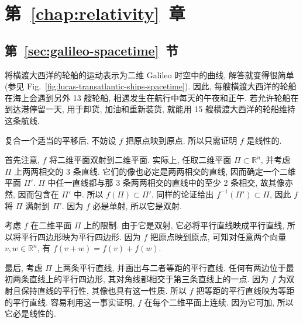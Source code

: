 \section{\texorpdfstring{第~\ref{chap:relativity}~章}{相对论}}\label{sec:solutions-relativity}
\subsection{\texorpdfstring{第~\ref{sec:galileo-spacetime}~节}{Galileo 时空}}\label{subsec:solutions-galileo-spacetime}

\begin{description}[font=\normalfont,leftmargin=2em,labelwidth=1.5em]
将横渡大西洋的轮船的运动表示为二维 Galileo 时空中的曲线, 解答就变得很简单 (参见 Fig.~\ref{fig:lucas-transatlantic-ships-spacetime}). 因此, 每艘横渡大西洋的轮船在海上会遇到另外 13 艘轮船, 相遇发生在航行中每天的午夜和正午. 若允许轮船在到达港停留一天, 用于卸货, 加油和重新装货, 就能用 15 艘横渡大西洋的轮船维持这条航线.

复合一个适当的平移后, 不妨设 $f$ 把原点映到原点. 所以只需证明 $f$ 是线性的.

首先注意, $f$ 将二维平面双射到二维平面. 实际上, 任取二维平面 $\Pi\subset\mathbb{R}^n$, 并考虑 $\Pi$ 上两两相交的 3 条直线. 它们的像也必定是两两相交的直线, 因而确定一个二维平面 $\Pi'$. $\Pi$ 中任一直线都与那 3 条两两相交的直线中的至少 2 条相交, 故其像亦然, 因而包含在 $\Pi'$ 中. 所以 $f(\Pi)\subset\Pi'$. 同样的论证给出 $f^{-1}(\Pi')\subset\Pi$, 因此 $f$ 将 $\Pi$ 满射到 $\Pi'$. 因为 $f$ 必是单射, 所以它是双射.

考虑 $f$ 在二维平面 $\Pi$ 上的限制. 由于它是双射, 它必将平行直线映成平行直线, 所以将平行四边形映为平行四边形. 因为 $f$ 把原点映到原点, 可知对任意两个向量 $v,w\in\mathbb{R}^n$, 有 $f(v+w)=f(v)+f(w)$.

最后, 考虑 $\Pi$ 上两条平行直线, 并画出与二者等距的平行直线. 任何有两边位于最初两条直线上的平行四边形, 其对角线都相交于第三条直线上的一点. 因为 $f$ 为双射且保持直线的平行性, 其像也具有这一性质. 所以 $f$ 把等距的平行直线映为等距的平行直线. 容易利用这一事实证明, $f$ 在每个二维平面上连续. 因为它可加, 所以它必是线性的.
\end{description}
